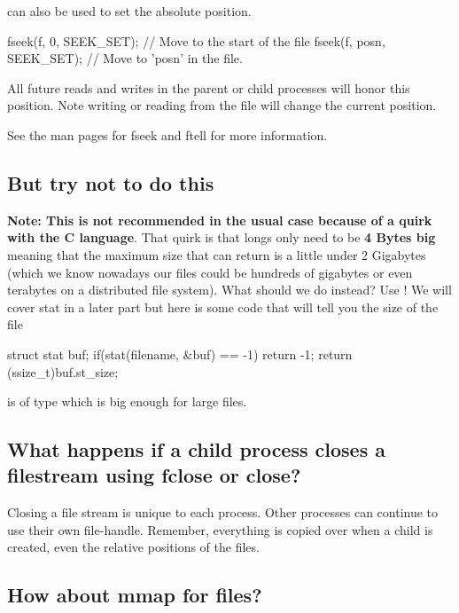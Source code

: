 \begin{enumerate}
 can also be used to set the absolute position.

\begin{code}[language=C]
fseek(f, 0, SEEK_SET); // Move to the start of the file 
fseek(f, posn, SEEK_SET);  // Move to 'posn' in the file.
\end{code}

All future reads and writes in the parent or child processes will honor
this position. Note writing or reading from the file will change the
current position.

See the man pages for fseek and ftell for more information.

\subsection{But try not to do this}

\textbf{Note: This is not recommended in the usual case because of a quirk with the C language}. That quirk is that longs only need to be \textbf{4 Bytes big} meaning that the maximum size that  can return is a little under 2 Gigabytes (which we know nowadays our files could be hundreds of gigabytes or even terabytes on a distributed file system). What should we do instead? Use ! We will cover stat in a later part but here is some code that will tell you the size of the file

\begin{code}[language=C]
struct stat buf;
if(stat(filename, &buf) == -1){
    return -1;
}
return (ssize_t)buf.st_size;
\end{code}

 is of type  which is big enough for large files.

\subsection{What happens if a child process closes a filestream using fclose or close?}

Closing a file stream is unique to each process. Other processes can continue to use their own file-handle. Remember, everything is copied over when a child is created, even the relative positions of the files.

\subsection{How about mmap for files?}\label{how-about-mmap-for-files}


\end{enumerate}
